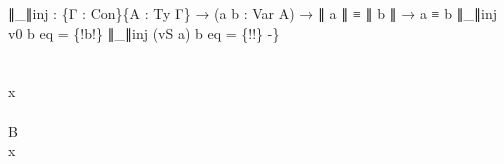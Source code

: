 \documentclass{acm_proc_article-sp}
\begin{document}
{\begin{code}
{∥\_∥inj : \{Γ : Con\}\{A : Ty Γ\} → (a b : Var A) → ∥ a ∥ ≡ ∥ b ∥ → a ≡ b
∥\_∥inj v0 b eq = \{!b!\}
∥\_∥inj (vS a) b eq = \{!!\}
-\}}\<%
\\
%
\\
\> \AgdaSymbol{:} \AgdaSymbol{\{} \AgdaSymbol{:} \AgdaSymbol{\}\{}  \AgdaSymbol{:}  \AgdaSymbol{\}\{} \AgdaSymbol{:}  \AgdaSymbol{\}(} \AgdaSymbol{:}   \AgdaSymbol{)}   \AgdaSymbol{(}   \AgdaSymbol{)}   \<%
\\
\> \AgdaSymbol{\{}x \AgdaSymbol{=} \AgdaSymbol{\}}  \AgdaSymbol{=}  \AgdaSymbol{(} \AgdaSymbol{)}\<%
\\
%
\\
\> \AgdaSymbol{:} \AgdaSymbol{\{} \AgdaSymbol{:} \AgdaSymbol{\}\{}   \AgdaSymbol{:}  \AgdaSymbol{\}\{} \AgdaSymbol{:}  \AgdaSymbol{\}(} \AgdaSymbol{:}   \AgdaSymbol{)}   \AgdaSymbol{(} \AgdaSymbol{\{}B \AgdaSymbol{=} \AgdaSymbol{\}} \AgdaSymbol{(}   \AgdaSymbol{))}   \AgdaSymbol{(} \AgdaSymbol{)}\<%
\\
\> \AgdaSymbol{\{}x \AgdaSymbol{=} \AgdaSymbol{\}}  \AgdaSymbol{=}  \AgdaSymbol{(} \AgdaSymbol{(} \AgdaSymbol{))}\<%
\\
%
\\
\> \AgdaSymbol{:} \AgdaSymbol{\{}  \AgdaSymbol{:} \AgdaSymbol{\}\{} \AgdaSymbol{:}  \AgdaSymbol{\}\{}  \AgdaSymbol{:}   \AgdaSymbol{\}\{} \AgdaSymbol{:}  \AgdaSymbol{\}}               \<[97]%
\>[97]\<%
\\
\>  \AgdaSymbol{=}  \AgdaSymbol{\_}\<%
\\
%
\\
\>\<\end{code}
}
\end{document}
